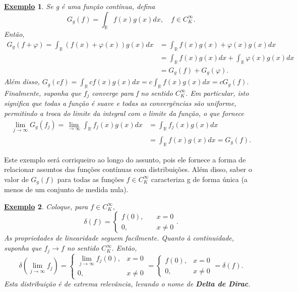 \documentclass{article}
\newtheorem{example}{\underline{Exemplo}}
\begin{document}
 \begin{example}
  Se g é uma função contínua, defina 
    \[
      G_{g}(f) = \int_{\mathbb{R}}^{}f(x)g(x)dx,\quad f\in C_{K}^{\infty}.
    \]
  Então, 
 \begin{align*}
   G_{g}(f + \varphi ) = \int_{\mathbb{R}}^{}(f(x)+\varphi (x))g(x)dx &= \int_{\mathbb{R}}^{}f(x)g(x) + \varphi (x)g(x)dx \\ 
                                                                      &= \int_{\mathbb{R}}^{}f(x)g(x)dx + \int_{\mathbb{R}}^{}\varphi (x)g(x)dx \\ 
                                                                      &= G_{g}(f) + G_{g}(\varphi ).
 \end{align*}
  Além disso, \(G_{g}(cf) = \int_{\mathbb{R}}^{}cf(x)g(x)dx = c \int_{\mathbb{R}}^{}f(x)g(x)dx = cG_{g}(f).\) Finalmente, suponha que \(f_{j}\) converge para f no sentido \(C_{K}^{\infty}.\) Em particular, isto significa que todas a função é suave e todas 
as convergências são uniforme, permitindo a troca do limite da integral com o limite da função, o que fornece
 \begin{align*}
   \lim_{j\to \infty}G_{g}(f_{j}) = \lim_{\to \infty} \int_{\mathbb{R}}^{}f_{j}(x)g(x)dx &= \int_{\mathbb{R}}^{}f_{j}(x)g(x)dx \\ 
                                                                                         &= \int_{\mathbb{R}}^{}f(x)g(x)dx = G_{g}(f).
 \end{align*}
 \end{example}
  Este exemplo será corriqueiro ao longo do assunto, pois ele fornece a forma de relacionar assuntos das funções contínuas com distribuições. Além disso, saber o valor de \(G_{g}(f)\) para todas as funções \(f\in C_{K}^{\infty}\) caracteriza g 
de forma única (a menos de um conjunto de medida nula).
 \begin{example}
   Coloque, para \(f\in C_{K}^{\infty},\)
     \[
       \delta (f) = \left\{\begin{array}{ll}
           f(0), &\quad x=0\\ 
           0,&\quad x\neq 0
         \end{array}\right..
     \]
    As propriedades de linearidade seguem facilmente. Quanto à continuidade, suponha que \(f_{j}\to f\) no sentido \(C_{K}^{\infty}.\) Então,
      \[
        \delta (\lim_{j\to \infty}f_{j})  = \left\{\begin{array}{ll}
            \lim_{j\to \infty}f_{j}(0), & x = 0 \\ 
            0, & x\neq 0
          \end{array}\right.  = \left\{\begin{array}{ll}
            f(0), & x = 0\\ 
            0, & x\neq 0
            \end{array}\right. = \delta (f).
      \]
    Esta distribuição é de extrema relevância, levando o nome de \textbf{Delta de Dirac}.
 \end{example}
\end{document}
